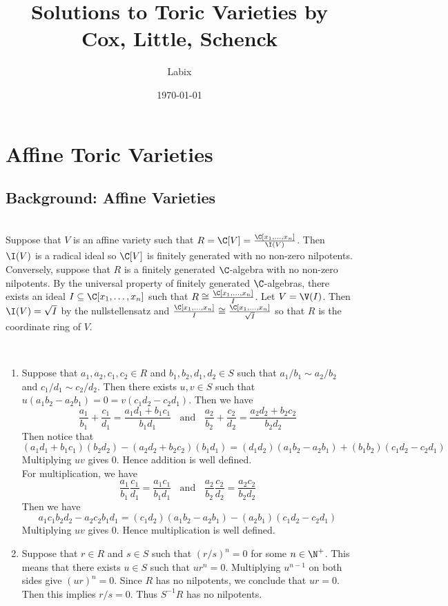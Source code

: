 \documentclass[a4paper]{article}
\title{Solutions to Toric Varieties by Cox, Little, Schenck}
\author{Labix}
\date{\today}
\begin{document}
\maketitle
\pagebreak
\tableofcontents

\pagebreak
\section{Affine Toric Varieties}
\setcounter{subsection}{-1}
\subsection{Background: Affine Varieties}
\begin{ex}{}{}\\
Suppose that $V$ is an affine variety such that $R=\C[V]=\frac{\C[x_1,\dots,x_n]}{\I(V)}$. Then $\I(V)$ is a radical ideal so $\C[V]$ is finitely generated with no non-zero nilpotents. \\

Conversely, suppose that $R$ is a finitely generated $\C$-algebra with no non-zero nilpotents. By the universal property of finitely generated $\C$-algebras, there exists an ideal $I\subseteq\C[x_1,\dots,x_n]$ such that $R\cong\frac{\C[x_1,\dots,x_n]}{I}$. Let $V=\V(I)$. Then $\I(V)=\sqrt{I}$ by the nullstellensatz and $\frac{\C[x_1,\dots,x_n]}{I}\cong\frac{\C[x_1,\dots,x_n]}{\sqrt{I}}$ so that $R$ is the coordinate ring of $V$. 
\end{ex}

\begin{ex}{}{}\\
\begin{enumerate}[label=(\alph*)]
\item Suppose that $a_1,a_2,c_1,c_2\in R$ and $b_1,b_2,d_1,d_2\in S$ such that $a_1/b_1\sim a_2/b_2$ and $c_1/d_1\sim c_2/d_2$. Then there exists $u,v\in S$ such that $u(a_1b_2-a_2b_1)=0=v(c_1d_2-c_2d_1)$. Then we have $$\frac{a_1}{b_1}+\frac{c_1}{d_1}=\frac{a_1d_1+b_1c_1}{b_1d_1}\;\;\text{ and }\;\;\frac{a_2}{b_2}+\frac{c_2}{d_2}=\frac{a_2d_2+b_2c_2}{b_2d_2}$$ Then notice that $$(a_1d_1+b_1c_1)(b_2d_2)-(a_2d_2+b_2c_2)(b_1d_1)=(d_1d_2)(a_1b_2-a_2b_1)+(b_1b_2)(c_1d_2-c_2d_1)$$ Multiplying $uv$ gives $0$. Hence addition is well defined. \\

For multiplication, we have $$\frac{a_1}{b_1}\frac{c_1}{d_1}=\frac{a_1c_1}{b_1d_1}\;\;\text{ and }\;\;\frac{a_2}{b_2}\frac{c_2}{d_2}=\frac{a_2c_2}{b_2d_2}$$ Then we have $$a_1c_1b_2d_2-a_2c_2b_1d_1=(c_1d_2)(a_1b_2-a_2b_1)-(a_2b_1)(c_1d_2-c_2d_1)$$ Multiplying $uv$ gives $0$. Hence multiplication is well defined. 
\item Suppose that $r\in R$ and $s\in S$ such that $(r/s)^n=0$ for some $n\in\N^+$. This means that there exists $u\in S$ such that $ur^n=0$. Multiplying $u^{n-1}$ on both sides give $(ur)^n=0$. Since $R$ has no nilpotents, we conclude that $ur=0$. Then this implies $r/s=0$. Thus $S^{-1}R$ has no nilpotents. 
\end{enumerate}
\end{ex}
\end{document}
